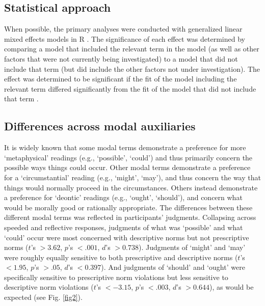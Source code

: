 \documentclass[11pt,letterpaper]{article}
\begin{document}
\subsection*{Statistical approach} When possible, the primary analyses were conducted with generalized linear mixed effects models \citep{jaeger2008categorical} in \textsf{R} \citep{bates2014lme4}. The significance of each effect was determined by comparing a model that included the relevant term in the model (as well as other factors that were not currently being investigated) to a model that did not include that term (but did include the other factors not under investigation). The effect was determined to be significant if the fit of the model including the relevant term differed significantly from the fit of the model that did not include that term \citep{barr2013random}.

\subsection*{Differences across modal auxiliaries}

It is widely known that some modal terms demonstrate a preference for more `metaphysical' readings (e.g., `possible', `could') and thus primarily concern the possible ways things could occur. Other modal terms demonstrate a preference for a `circumstantial' reading (e.g., `might', `may'), and thus concern the way that things would normally proceed in the circumstances. Others instead demonstrate a preference for `deontic' readings (e.g., `ought', `should'), and concern what would be morally good or rationally appropriate. The differences between these different modal terms was reflected in participants' judgments. Collapsing across speeded and reflective responses, judgments of what was `possible' and what `could' occur were most concerned with descriptive norms but not prescriptive norms ($t$'s $> 3.62$, $p$'s $< .001$, $d$'s $>0.738$). Judgments of `might' and `may' were roughly equally sensitive to both prescriptive and descriptive norms ($t$'s $< 1.95$, $p$'s $> .05$, $d$'s $<0.397$). And judgments of `should' and `ought' were specifically sensitive to prescriptive norm violations but less sensitive to descriptive norm violations ($t$'s $< -3.15$, $p$'s $< .003$, $d$'s $>0.644$), as would be expected (see Fig. \ref{fig2}).
\end{document}
